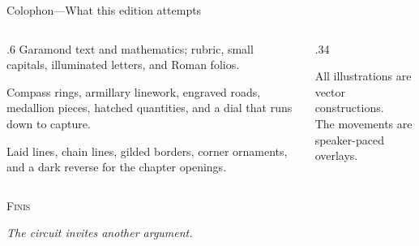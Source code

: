 \documentclass[aspectratio=169,11pt]{beamer}
\begin{document}
\begin{frame}{Colophon\enspace—\enspace What this edition attempts}
  \begin{columns}[T,onlytextwidth]
    \begin{column}{.6\textwidth}
      Garamond text and mathematics; rubric, small capitals,
      illuminated letters, and Roman folios.
      \par\medskip
      Compass rings, armillary linework, engraved roads, medallion pieces,
      hatched quantities, and a dial that runs down to capture.
      \par\medskip
      Laid lines, chain lines, gilded borders, corner ornaments,
      and a dark reverse for the chapter openings.
    \end{column}
    \begin{column}{.34\textwidth}
      \centering\AtlasGrandFleuron[24mm]\par\medskip
      {\scriptsize All illustrations are vector constructions.\\
      The movements are speaker-paced overlays.}
    \end{column}
  \end{columns}
\end{frame}

{\AtlasGrandNight
\begin{frame}
  \centering
  \AtlasGrandAstrolabe[32mm]\par\medskip
  {\color{AtlasIvory}\fontsize{38}{40}\selectfont\textsc{Finis}\par}
  \medskip
  {\color{AtlasGoldLight}\large\itshape The circuit invites another argument.\par}
  \bigskip
  \par\smallskip
  {\color{AtlasGoldLight}\scriptsize{}\par}
\end{frame}}
\end{document}
